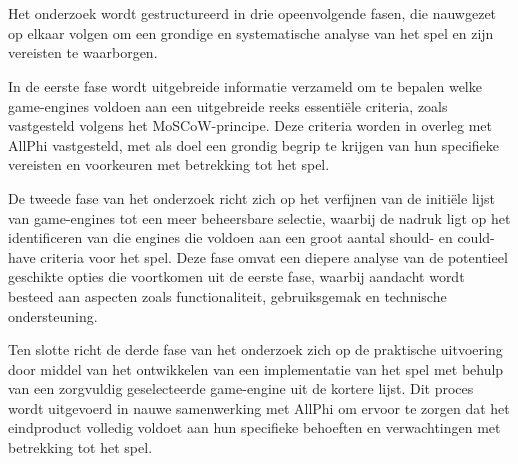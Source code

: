 
\chapter{}%
\label{ch:long-list}


Het onderzoek wordt gestructureerd in drie opeenvolgende fasen, die nauwgezet op elkaar volgen om een grondige en systematische analyse van het spel en zijn vereisten te waarborgen.

In de eerste fase wordt uitgebreide informatie verzameld om te bepalen welke game-engines voldoen aan een uitgebreide reeks essentiële criteria, zoals vastgesteld volgens het MoSCoW-principe. Deze criteria worden in overleg met AllPhi vastgesteld, met als doel een grondig begrip te krijgen van hun specifieke vereisten en voorkeuren met betrekking tot het spel.

De tweede fase van het onderzoek richt zich op het verfijnen van de initiële lijst van game-engines tot een meer beheersbare selectie, waarbij de nadruk ligt op het identificeren van die engines die voldoen aan een groot aantal should- en could-have criteria voor het spel. Deze fase omvat een diepere analyse van de potentieel geschikte opties die voortkomen uit de eerste fase, waarbij aandacht wordt besteed aan aspecten zoals functionaliteit, gebruiksgemak en technische ondersteuning.

Ten slotte richt de derde fase van het onderzoek zich op de praktische uitvoering door middel van het ontwikkelen van een implementatie van het spel met behulp van een zorgvuldig geselecteerde game-engine uit de kortere lijst. Dit proces wordt uitgevoerd in nauwe samenwerking met AllPhi om ervoor te zorgen dat het eindproduct volledig voldoet aan hun specifieke behoeften en verwachtingen met betrekking tot het spel.

